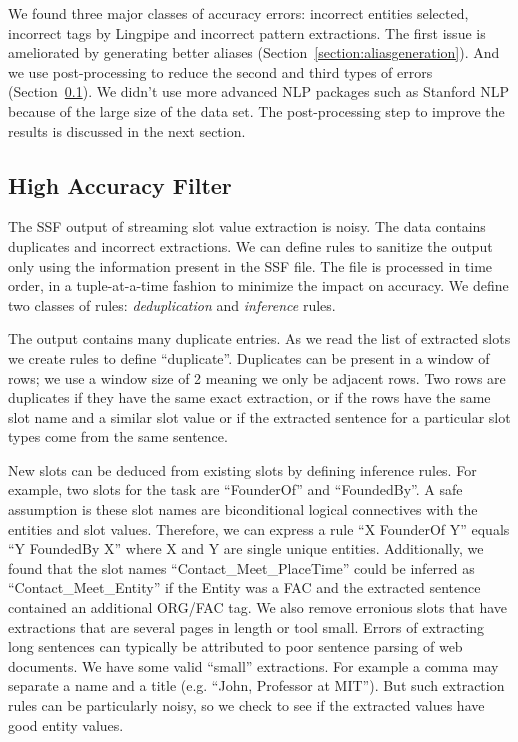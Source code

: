 We found three major classes of accuracy errors:
incorrect entities selected, incorrect tags by Lingpipe and incorrect pattern extractions.
The first issue is ameliorated by generating better aliases (Section~\ref{section:aliasgeneration}). And we use
post-processing to reduce the second and third types of errors (Section~\ref{section:highAccuracyFilter}).
We didn't use more advanced NLP packages such as Stanford NLP because of the large size of the data set.
The post-processing step to improve the results is discussed in the next section.

\subsection{High Accuracy Filter}
\label{section:highAccuracyFilter}

The SSF output of streaming slot value extraction is noisy. The data contains duplicates and 
incorrect extractions. We can define rules to sanitize the output only using 
the information present in the SSF file. The file is processed in time order, 
in a tuple-at-a-time fashion to minimize the impact on accuracy. We define 
two classes of rules: \textit{deduplication} and \textit{inference} rules.

The output contains many duplicate entries. As we read the list of extracted 
slots we create rules to define ``duplicate''. Duplicates can be present in a 
window of rows; we use a window size of 2 meaning we only be adjacent rows. 
Two rows are duplicates if they have the same exact extraction, or if the 
rows have the same slot name and a similar slot value or if the extracted 
sentence for a particular slot types come from the same sentence.

 New slots can be deduced from existing slots by defining inference rules. 
 For example, two slots for the task are ``FounderOf'' and ``FoundedBy''. A safe 
 assumption is these slot names are biconditional logical connectives with the 
 entities and slot values. Therefore, we can express a rule ``X FounderOf Y'' 
 equals ``Y FoundedBy X'' where X and Y are single unique entities. Additionally,
 we found that the slot names ``Contact\_Meet\_PlaceTime'' could be inferred as
 ``Contact\_Meet\_Entity'' if the Entity was a FAC and the extracted sentence 
 contained an additional ORG/FAC tag.  
We also remove erronious slots that have extractions that are several pages in 
length or tool small. Errors of extracting long sentences can typically be 
attributed to poor sentence parsing of web documents. We have some valid
``small'' extractions. For example a comma may separate a name and a title
(e.g. ``John, Professor at MIT''). But such extraction rules can be particularly 
noisy, so we check to see if the extracted values have good entity values.




